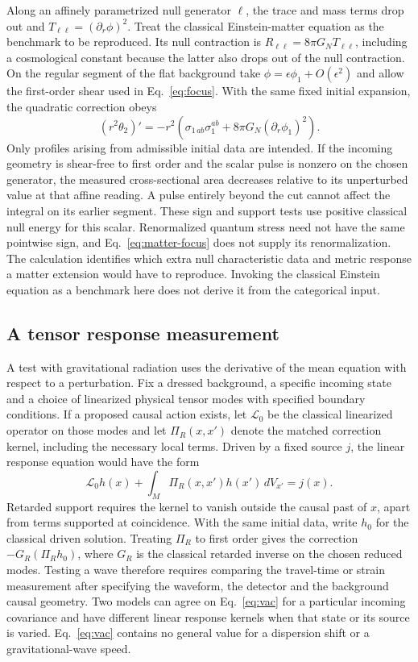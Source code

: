 \documentclass[11pt,letterpaper]{article}
\begin{document}
Along an affinely parametrized null generator \(\ell\), the trace and
mass terms drop out and \(T_{\ell\ell}=(\partial_r\phi)^2\).
Treat the classical Einstein-matter equation as the benchmark to be
reproduced. Its null contraction is \(R_{\ell\ell}=8\pi G_N
T_{\ell\ell}\), including a cosmological constant because the latter
also drops out of the null contraction. On the regular segment of the
flat background take \(\phi=\epsilon\phi_1+O(\epsilon^2)\) and allow
the first-order shear used in Eq.~\eqref{eq:focus}. With the same
fixed initial expansion, the quadratic correction obeys
\begin{equation}
 (r^2\theta_2)' =
  -r^2\left(\sigma_{1\,ab}\sigma_1^{ab}
                         +8\pi G_N(\partial_r\phi_1)^2\right).
 \label{eq:matter-focus}
\end{equation}
Only profiles arising from admissible initial data are intended.
If the incoming geometry is shear-free to first order and the scalar
pulse is nonzero on the chosen generator, the measured cross-sectional
area decreases relative to its unperturbed value at that affine reading.
A pulse entirely beyond the cut cannot affect the integral on its
earlier segment. These sign and support tests use positive classical
null energy for this scalar. Renormalized quantum stress need not have
the same pointwise sign, and Eq.~\eqref{eq:matter-focus} does not
supply its renormalization. The calculation identifies which extra
null characteristic data and metric response a matter extension would
have to reproduce. Invoking the classical Einstein equation as a
benchmark here does not derive it from the categorical input.

\subsection{A tensor response measurement}
A test with gravitational radiation uses the derivative of the mean
equation with respect to a perturbation. Fix a dressed background,
a specific incoming state and a choice of linearized physical tensor
modes with specified boundary conditions. If a proposed causal action
exists, let \(\mathcal L_0\) be the classical linearized operator on
those modes and let \(\Pi_R(x,x')\) denote the matched correction kernel,
including the necessary local terms. Driven by a fixed source \(j\), the
linear response equation would have the form
\[
 \mathcal L_0 h(x)+\int_M \Pi_R(x,x')h(x')\,dV_{x'}=j(x).
\]
Retarded support requires the kernel to vanish outside the causal past
of \(x\), apart from terms supported at coincidence. With the same
initial data, write \(h_0\) for the classical driven solution. Treating
\(\Pi_R\) to first order gives the correction
\(-G_R(\Pi_R h_0)\), where \(G_R\) is the classical retarded inverse on
the chosen reduced modes. Testing a wave therefore requires comparing
the travel-time or strain measurement after specifying the waveform,
the detector and the background causal geometry. Two models can agree
on Eq.~\eqref{eq:vac} for a particular incoming covariance and have
different linear response kernels when that state or its source is
varied. Eq.~\eqref{eq:vac} contains no general value for a dispersion
shift or a gravitational-wave speed.
\end{document}
